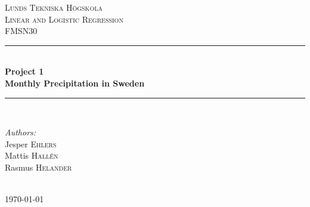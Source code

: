 \begin{titlepage}

\newcommand{\HRule}{\rule{\linewidth}{0.5mm}}
\center 
\textsc{\LARGE Lunds Tekniska Högskola}\\[1.5cm]
\textsc{\Large Linear and Logistic Regression}\\[0.5cm]
\textsc{\large FMSN30}\\[0.5cm]
\HRule \\[0.4cm]
{ \huge \bfseries Project 1 \\ Monthly Precipitation in Sweden}\\[0.4cm]
\HRule \\[2cm]
\begin{minipage}{0.4\textwidth}
\large
\emph{Authors:}
\emph{}\\
Jesper \textsc{Ehlers} 
\\ 
Mattis \textsc{Hallén}
\\
Rasmus \textsc{Helander} 
\end{minipage}

\begin{minipage}{0.4\textwidth}
\end{minipage}\\[2cm]

{\today}

\vfill

\end{titlepage}